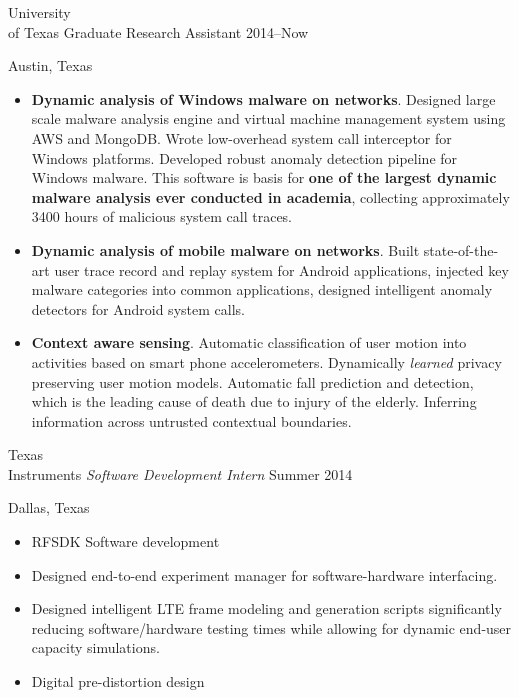 \documentclass[]{friggeri-cv} %
\begin{document}
\begin{entrylist}


\entry
{University \\ of Texas}
{Graduate Research Assistant}
{2014--Now}
{Austin, Texas \\
\begin{itemize}
\item \textbf{Dynamic analysis of Windows malware on networks}. Designed large scale malware analysis engine and virtual machine management system using AWS and MongoDB. Wrote low-overhead system call interceptor for Windows platforms. Developed robust anomaly detection pipeline for Windows malware. This software is basis for \textbf{one of the largest dynamic malware analysis ever conducted in academia}, collecting approximately 3400 hours of malicious system call traces.
\item \textbf{Dynamic analysis of mobile malware on networks}. Built state-of-the-art user trace record and replay system for Android applications, injected key malware categories into common applications, designed intelligent anomaly detectors for Android system calls.
\item \textbf{Context aware sensing}. Automatic classification of user motion into activities based on smart phone accelerometers. Dynamically \textit{learned} privacy preserving user motion models. Automatic fall prediction and detection, which is the leading cause of death due to injury of the elderly. Inferring information across untrusted contextual boundaries. 
\end{itemize} }


\entry
{Texas \\ Instruments}
{\emph{Software Development Intern}}
{Summer 2014}
{Dallas, Texas \\  
\begin{itemize}
\item RFSDK Software development
\item Designed end-to-end experiment manager for software-hardware interfacing.
\item Designed intelligent LTE frame modeling and generation scripts significantly reducing software/hardware testing times while allowing for dynamic end-user capacity simulations.
\item Digital pre-distortion design 
\end{itemize}}


\end{entrylist}
\end{document}
